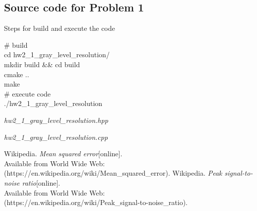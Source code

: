 \documentclass[a4paper, 11pt]{article}
\begin{document}
\subsection*{Source code for Problem 1}
\vspace{0.5em}
Steps for build and execute the code
\begin{tcolorbox}[colback=black!2!white,colframe=black!30!white]
  {\selectfont
    {\color{gray}\# build} \\
    cd hw2\_1\_gray\_level\_resolution/ \\
    mkdir build \&\& cd build \\
    cmake ..\\
    make \\
    {\color{gray}\# execute code}\\
    ./hw2\_1\_gray\_level\_resolution
  }
\end{tcolorbox}
\newpage
\it{hw2\_1\_gray\_level\_resolution.hpp}
\begin{figure}[h!]
  \centering
\end{figure}

\it{hw2\_1\_gray\_level\_resolution.cpp}
\begin{figure}[h!]
  \centering
\end{figure}
\begin{figure}[h!]
  \centering
\end{figure}
\begin{figure}[h!]
  \centering
\end{figure}
\newline
\begin{thebibliography}{9}
   Wikipedia. \emph{Mean squared error}[online]. \\
  Available from World Wide Web: (https://en.wikipedia.org/wiki/Mean\_squared\_error).
   Wikipedia. \emph{Peak signal-to-noise ratio}[online].\\
  Available from World Wide Web: \\
  (https://en.wikipedia.org/wiki/Peak\_signal-to-noise\_ratio).
\end{thebibliography}
\end{document}
